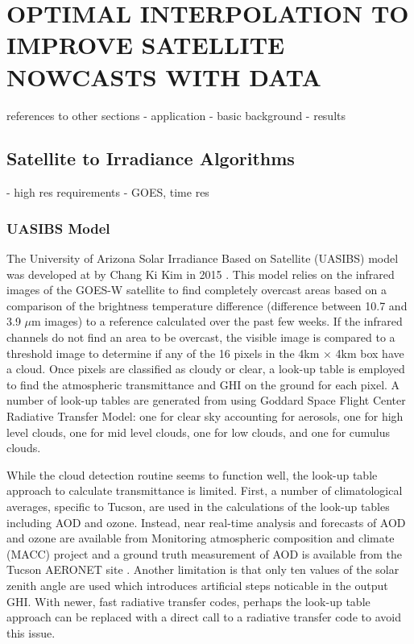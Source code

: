 \chapter{OPTIMAL INTERPOLATION TO IMPROVE SATELLITE NOWCASTS WITH DATA}
\label{chap:satoi}

references to other sections
- application
- basic background
- results

\section{Satellite to Irradiance Algorithms}
- high res requirements
- GOES, time res

\subsection{UASIBS Model}
The University of Arizona Solar Irradiance Based on Satellite (UASIBS)
model was developed at by Chang Ki Kim in 2015 \citep{Kim2016}.
This model relies on the infrared images of the GOES-W satellite to
find completely overcast areas based on a comparison of the brightness
temperature difference (difference between 10.7 and 3.9 $\mu$m
images) to a reference calculated over the past few weeks.
If the infrared channels do not find an area to be overcast, the
visible image is compared to a threshold image to determine if any of
the 16 pixels in the 4km $\times$ 4km box have a cloud.
Once pixels are classified as cloudy or clear, a look-up table is
employed to find the atmospheric transmittance and GHI on the ground
for each pixel.
A number of look-up tables are generated from using Goddard Space
Flight Center Radiative Transfer Model: one for clear sky
accounting for aerosols, one for high level clouds, one for mid level
clouds, one for low clouds, and one for cumulus clouds.

While the cloud detection routine seems to function well, the look-up
table approach to calculate transmittance is limited.
First, a number of climatological averages, specific to Tucson, are
used in the calculations of the look-up tables including AOD and
ozone.
Instead, near real-time analysis and forecasts of AOD and ozone are
available from Monitoring atmospheric composition and climate (MACC)
project \citep{Morcrette2009} and a ground truth measurement of AOD is
available from the Tucson AERONET site \citep{Holben1998}.
Another limitation is that only ten values of the solar zenith angle
are used which introduces artificial steps noticable in the output
GHI.
With newer, fast radiative transfer codes, perhaps the look-up table
approach can be replaced with a direct call to a radiative transfer
code to avoid this issue.

